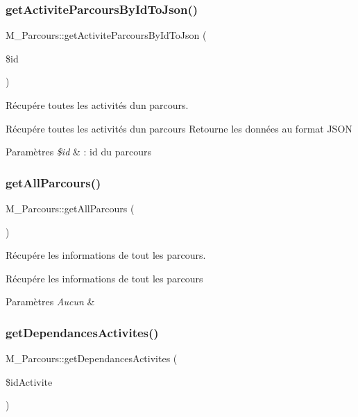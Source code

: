 \subsubsection{\texorpdfstring{get\+Activite\+Parcours\+By\+Id\+To\+Json()}{getActiviteParcoursByIdToJson()}}
{\footnotesize\ttfamily M\+\_\+\+Parcours\+::get\+Activite\+Parcours\+By\+Id\+To\+Json (\begin{DoxyParamCaption}\item[{}]{\$id }\end{DoxyParamCaption})}



Récupére toutes les activités d\textquotesingle{}un parcours. 

Récupére toutes les activités d\textquotesingle{}un parcours Retourne les données au format J\+S\+ON 
\begin{DoxyParams}{Paramètres}
{\em \$id} & \+: id du parcours \\
\hline
\end{DoxyParams}
\mbox{\label{class_m___parcours_ae550e9d7d995ac5b58d7613d74c1d248}} 
\subsubsection{\texorpdfstring{get\+All\+Parcours()}{getAllParcours()}}
{\footnotesize\ttfamily M\+\_\+\+Parcours\+::get\+All\+Parcours (\begin{DoxyParamCaption}{ }\end{DoxyParamCaption})}



Récupére les informations de tout les parcours. 

Récupére les informations de tout les parcours 
\begin{DoxyParams}{Paramètres}
{\em Aucun} & \\
\hline
\end{DoxyParams}
\mbox{\label{class_m___parcours_ac5b350eeb8ba4a1da8119e830b4b945a}} 
\subsubsection{\texorpdfstring{get\+Dependances\+Activites()}{getDependancesActivites()}}
{\footnotesize\ttfamily M\+\_\+\+Parcours\+::get\+Dependances\+Activites (\begin{DoxyParamCaption}\item[{}]{\$id\+Activite }\end{DoxyParamCaption})}



